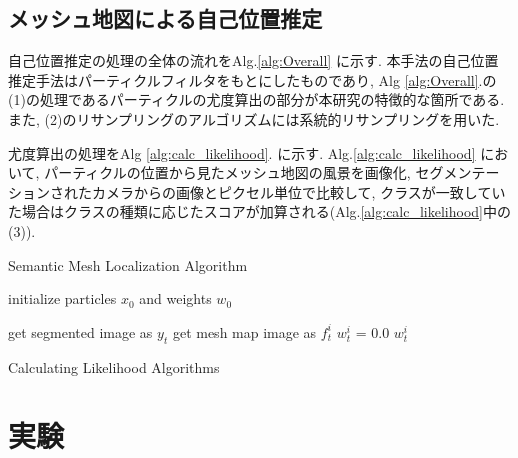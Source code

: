 \documentclass[letterpaper, 9 pt, conference]{ieeeconf}
\begin{document}
\subsection{メッシュ地図による自己位置推定}
自己位置推定の処理の全体の流れをAlg.\ref{alg:Overall} に示す. 本手法の自己位置推定手法はパーティクルフィルタ\cite{MCL_paper}をもとにしたものであり, Alg \ref{alg:Overall}.の(1)の処理であるパーティクルの尤度算出の部分が本研究の特徴的な箇所である. また, (2)のリサンプリングのアルゴリズムには系統的リサンプリング\cite{ueda_prob_robotics}を用いた. \par 尤度算出の処理をAlg \ref{alg:calc_likelihood}. に示す. Alg.\ref{alg:calc_likelihood} において, パーティクルの位置から見たメッシュ地図の風景を画像化, セグメンテーションされたカメラからの画像とピクセル単位で比較して, クラスが一致していた場合はクラスの種類に応じたスコアが加算される(Alg.\ref{alg:calc_likelihood}中の(3)).

\begin{algorithm}[htpb]
\SetAlgoLined
\caption{Semantic Mesh Localization Algorithm}
\label{alg:Overall}
 initialize particles $x_{0}$ and weights $w_{0}$\;
\end{algorithm}

\begin{algorithm}[htpb]
 get segmented image as $y_{t}$ \;
 get mesh map image as $f_{t}^{i}$ \;
 $w^{i}_{t}$ = 0.0\;
 \Return $w^{i}_{t}$\;
 
 \caption{Calculating Likelihood Algorithms}
 \label{alg:calc_likelihood}
\end{algorithm}

\section{実験}
\end{document}
